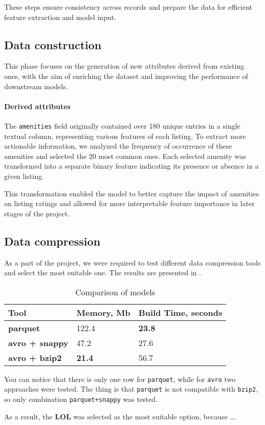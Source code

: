 These steps ensure consistency across records and prepare the data for efficient feature extraction and model input.

\subsection{Data construction}\label{sec:dataConstruction}
This phase focuses on the generation of new attributes derived from existing ones, with the aim of enriching the dataset and improving the performance of downstream models.

\paragraph{Derived attributes}
The \texttt{amenities} field originally contained over 180 unique entries in a single textual column, representing various features of each listing. To extract more actionable information, we analyzed the frequency of occurrence of these amenities and selected the 20 most common ones. Each selected amenity was transformed into a separate binary feature indicating its presence or absence in a given listing.

This transformation enabled the model to better capture the impact of amenities on listing ratings and allowed for more interpretable feature importance in later stages of the project.

\subsection{Data compression}\label{sec:dataCompression}
As a part of the project, we were required to test different data compression tools and select the most suitable one. The results are presented in .

\begin{table}[ht!]
  \small
  \centering
  \caption{Comparison of models}\label{tab:compression_comp}
  \begin{tabular}{lll}
    \toprule
    Tool                   & {Memory, Mb}  & {Build Time, seconds} \\
    \midrule
    \textbf{parquet}       & 122.4         & \textbf{23.8}         \\
    \textbf{avro + snappy} & 47.2          & 27.6                  \\
    \textbf{avro + bzip2}  & \textbf{21.4} & 56.7                  \\
    \bottomrule
  \end{tabular}
\end{table}

You can notice that there is only one row for \texttt{parquet}, while for \texttt{avro} two approaches were tested. The thing is that \texttt{parquet} is not compatible with \texttt{bzip2}, so only combination \texttt{parquet+snappy} was tested.

As a result, the \textbf{LOL} was selected as the most suitable option, because \ldots.